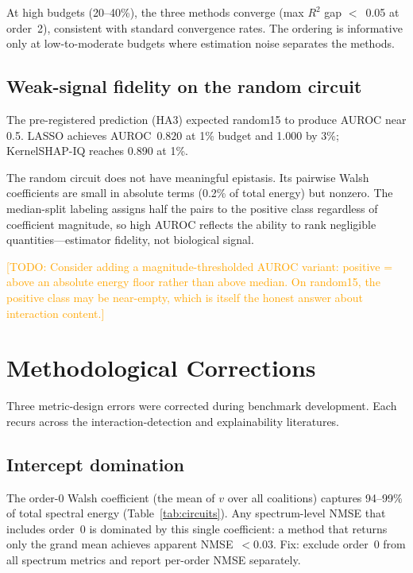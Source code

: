 \documentclass[11pt]{article}
\newcommand{\todo}[1]{\textcolor{orange}{[TODO: #1]}}
\begin{document}
At high budgets (20--40\%), the three methods converge
(max $R^2$ gap $<$~0.05 at order~2), consistent with standard
convergence rates. The ordering is informative only at low-to-moderate
budgets where estimation noise separates the methods.


\subsection{Weak-signal fidelity on the random circuit}
\label{sec:weak-signal}

The pre-registered prediction (HA3) expected random15 to produce
AUROC near 0.5. LASSO achieves AUROC~$0.820$ at 1\% budget and
1.000 by 3\%; KernelSHAP-IQ reaches 0.890 at 1\%.

The random circuit does not have meaningful epistasis. Its pairwise
Walsh coefficients are small in absolute terms (0.2\% of total
energy) but nonzero. The median-split labeling assigns half the
pairs to the positive class regardless of coefficient magnitude,
so high AUROC reflects the ability to rank negligible
quantities---estimator fidelity, not biological signal.

\todo{Consider adding a magnitude-thresholded AUROC variant:
positive = above an absolute energy floor rather than above
median. On random15, the positive class may be near-empty,
which is itself the honest answer about interaction content.}


\section{Methodological Corrections}
\label{sec:audit}

Three metric-design errors were corrected during benchmark
development. Each recurs across the interaction-detection and
explainability literatures.

\subsection{Intercept domination}

The order-0 Walsh coefficient (the mean of $v$ over all coalitions)
captures 94--99\% of total spectral energy
(Table~\ref{tab:circuits}). Any spectrum-level NMSE that includes
order~0 is dominated by this single coefficient: a method that
returns only the grand mean achieves apparent NMSE~$< 0.03$. Fix:
exclude order~0 from all spectrum metrics and report per-order NMSE
separately.
\end{document}
